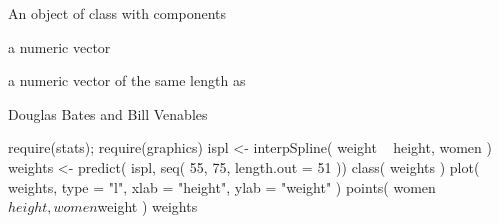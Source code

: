 %
\begin{Value}
An object of class  with components
\begin{ldescription}
\item[\code{x}] a numeric vector
\item[\code{y}] a numeric vector of the same length as 
\end{ldescription}
\end{Value}
%
\begin{Author}\relax
Douglas Bates and Bill Venables
\end{Author}
%
\begin{Examples}
\begin{ExampleCode}
require(stats); require(graphics)
ispl <- interpSpline( weight ~ height, women )
weights <- predict( ispl, seq( 55, 75, length.out = 51 ))
class( weights )
plot( weights, type = "l", xlab = "height", ylab = "weight" )
points( women$height, women$weight )
weights
\end{ExampleCode}
\end{Examples}
\clearpage
